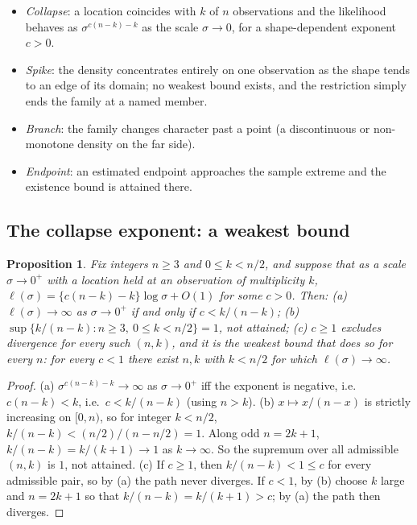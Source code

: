 \documentclass[11pt]{article}
\theoremstyle{plain}
\newtheorem{proposition}{Proposition}
\theoremstyle{definition}
\theoremstyle{remark}
\begin{document}
\begin{itemize}
  \item \emph{Collapse}: a location coincides with $k$ of $n$ observations
    and the likelihood behaves as $\sigma^{c(n-k)-k}$ as the scale
    $\sigma\to0$, for a shape-dependent exponent $c>0$.
  \item \emph{Spike}: the density concentrates entirely on one observation
    as the shape tends to an edge of its domain; no weakest bound exists,
    and the restriction simply ends the family at a named member.
  \item \emph{Branch}: the family changes character past a point (a
    discontinuous or non-monotone density on the far side).
  \item \emph{Endpoint}: an estimated endpoint approaches the sample
    extreme and the existence bound is attained there.
\end{itemize}

\subsection*{The collapse exponent: a weakest bound}

\begin{proposition}\label{prop:collapse}
Fix integers $n\ge3$ and $0\le k<n/2$, and suppose that as a scale
$\sigma\to0^+$ with a location held at an observation of multiplicity $k$,
$\ell(\sigma) = \{c(n-k)-k\}\log\sigma + O(1)$ for some $c>0$. Then:
(a) $\ell(\sigma)\to\infty$ as $\sigma\to0^+$ if and only if $c<k/(n-k)$;
(b) $\sup\{k/(n-k): n\ge3,\ 0\le k<n/2\} = 1$, not attained;
(c) $c\ge1$ excludes divergence for every such $(n,k)$, and it is the
weakest bound that does so for every $n$: for every $c<1$ there exist $n,k$
with $k<n/2$ for which $\ell(\sigma)\to\infty$.
\end{proposition}

\begin{proof}
(a) $\sigma^{c(n-k)-k}\to\infty$ as $\sigma\to0^+$ iff the exponent is
negative, i.e.\ $c(n-k)<k$, i.e.\ $c<k/(n-k)$ (using $n>k$).
(b) $x\mapsto x/(n-x)$ is strictly increasing on $[0,n)$, so for integer
$k<n/2$, $k/(n-k) < (n/2)/(n-n/2) = 1$. Along odd $n=2k+1$,
$k/(n-k)=k/(k+1)\to1$ as $k\to\infty$. So the supremum over all admissible
$(n,k)$ is $1$, not attained.
(c) If $c\ge1$, then $k/(n-k)<1\le c$ for every admissible pair, so by (a)
the path never diverges. If $c<1$, by (b) choose $k$ large and $n=2k+1$ so
that $k/(n-k)=k/(k+1)>c$; by (a) the path then diverges.
\end{proof}
\end{document}
